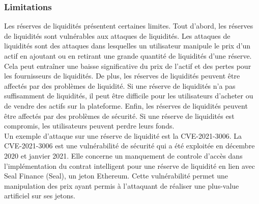 \subsubsection{Limitations}
Les réserves de liquidités présentent certaines limites. Tout d’abord, les réserves de liquidités sont vulnérables aux attaques de liquidités. Les attaques de liquidités sont des attaques dans lesquelles un utilisateur manipule le prix d’un actif en ajoutant ou en retirant une grande quantité de liquidités d’une réserve. Cela peut entraîner une baisse significative du prix de l’actif et des pertes pour les fournisseurs de liquidités. De plus, les réserves de liquidités peuvent être affectés par des problèmes de liquidité. Si une réserve de liquidités n’a pas suffisamment de liquidités, il peut être difficile pour les utilisateurs d’acheter ou de vendre des actifs sur la plateforme. Enfin, les réserves de liquidités peuvent être affectés par des problèmes de sécurité. Si une réserve de liquidités est compromis, les utilisateurs peuvent perdre leurs fonds. \\
Un exemple d'attaque sur une réserve de liquidité est la CVE-2021-3006. La CVE-2021-3006 est une vulnérabilité de sécurité qui a été exploitée en décembre 2020 et janvier 2021. Elle concerne un manquement de controle d'accès dans l’implémentation du contrat intelligent pour une réserve de liquidité en lien avec Seal Finance (Seal), un jeton Ethereum. Cette vulnérabilité permet une manipulation des prix ayant permis à l'attaquant de réaliser une plus-value artificiel sur ses jetons.